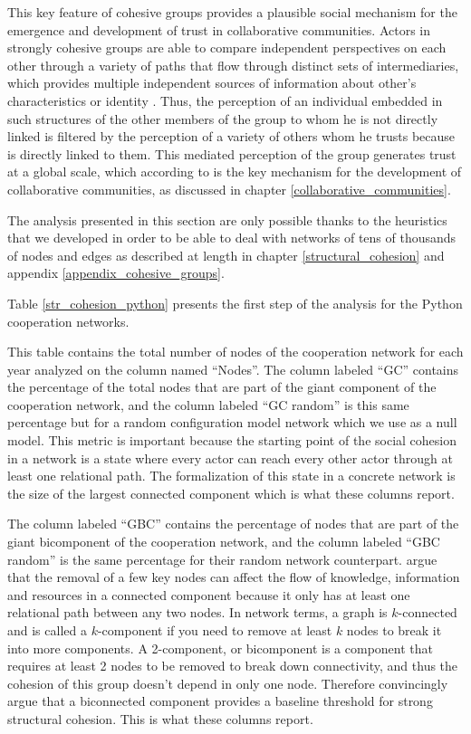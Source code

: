 This key feature of cohesive groups provides a plausible social mechanism for the emergence and development of trust in collaborative communities. Actors in strongly cohesive groups are able to compare independent perspectives on each other through a variety of paths that flow through distinct sets of intermediaries, which provides multiple independent sources of information about other's characteristics or identity \citep[320]{white:2001}. Thus, the perception of an individual embedded in such structures of the other members of the group to whom he is not directly linked is filtered by the perception of a variety of others whom he trusts because is directly linked to them. This mediated perception of the group generates trust at a global scale, which according to \citet{adler:2006} is the key mechanism for the development of collaborative communities, as discussed in chapter \ref{collaborative_communities}.

The analysis presented in this section are only possible thanks to the heuristics that we developed in order to be able to deal with networks of tens of thousands of nodes and edges as described at length in chapter \ref{structural_cohesion} and appendix \ref{appendix_cohesive_groups}. 

Table \ref{str_cohesion_python} presents the first step of the analysis for the Python cooperation networks.



This table contains the total number of nodes of the cooperation network for each year analyzed on the column named ``Nodes''. The column labeled ``GC'' contains the percentage of the total nodes that are part of the giant component of the cooperation network, and the column labeled ``GC random'' is this same percentage but for a random configuration model network which we use as a null model. This metric is important because the starting point of the social cohesion in a network is a state where every actor can reach every other actor through at least one relational path. The formalization of this state in a concrete network is the size of the largest connected component which is what these columns report. 

The column labeled ``GBC'' contains the percentage of nodes that are part of the giant bicomponent of the cooperation network, and the column labeled ``GBC random'' is the same percentage for their random network counterpart. \citet{moody:2003} argue that the removal of a few key nodes can affect the flow of knowledge, information and resources in a connected component because it only has at least one relational path between any two nodes. In network terms, a graph is $k$-connected and is called a $k$-component if you need to remove at least $k$ nodes to break it into more components. A 2-component, or bicomponent is a component that requires at least 2 nodes to be removed to break down connectivity, and thus the cohesion of this group doesn't depend in only one node. Therefore \citet{moody:2003} convincingly argue that a biconnected component provides a baseline threshold for strong structural cohesion. This is what these columns report.


